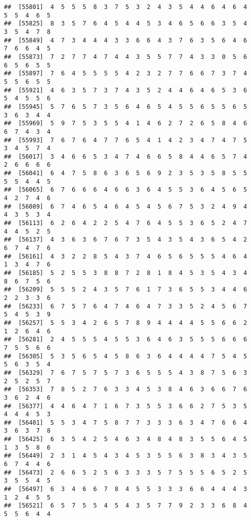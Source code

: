 \documentclass[
]{book}
\begin{document}
\begin{verbatim}
##  [55801]  4  5  5  5  8  3  7  5  3  2  4  3  5  4  4  6  4  6  4  5  5  4  6  5
##  [55825]  8  3  5  7  6  4  5  4  4  5  3  4  6  5  6  6  3  5  4  3  5  4  7  8
##  [55849]  4  7  3  4  4  4  3  3  6  6  4  3  7  6  3  5  6  4  6  7  6  6  4  5
##  [55873]  7  2  7  7  4  7  4  4  3  5  5  7  7  4  3  3  0  5  6  6  5  6  5  5
##  [55897]  7  6  4  5  5  5  5  4  2  3  2  7  7  6  6  7  3  7  4  5  5  6  5  5
##  [55921]  4  6  3  5  7  3  7  4  3  5  2  4  4  6  4  6  5  3  6  5  4  5  5  6
##  [55945]  5  7  6  5  7  3  5  6  4  6  5  4  5  5  6  5  5  6  5  3  6  3  4  4
##  [55969]  5  9  7  5  3  5  5  4  1  4  6  2  7  2  6  5  8  4  6  6  7  4  3  4
##  [55993]  7  6  7  6  4  7  7  6  5  4  1  4  2  3  4  7  4  7  5  3  4  5  7  4
##  [56017]  3  4  6  6  5  3  4  7  4  6  6  5  8  4  4  6  5  7  4  2  6  6  6  6
##  [56041]  6  4  7  5  8  6  3  6  5  6  9  2  3  5  3  5  8  5  5  5  5  4  4  5
##  [56065]  6  7  6  6  6  4  6  6  3  6  4  5  5  3  6  4  5  6  5  4  2  7  4  6
##  [56089]  6  7  4  6  5  4  6  4  5  4  5  6  7  5  3  2  4  9  4  4  3  5  3  4
##  [56113]  6  2  6  4  2  2  5  4  7  6  4  5  5  3  6  5  2  4  7  4  4  5  2  5
##  [56137]  4  3  6  3  6  7  6  7  3  5  4  3  5  4  3  6  5  4  2  6  7  4  7  6
##  [56161]  4  3  2  2  8  5  4  3  7  4  6  5  6  5  5  5  4  6  4  1  3  4  7  6
##  [56185]  5  2  5  5  3  8  8  7  2  8  1  8  4  5  3  5  4  3  4  8  6  7  5  6
##  [56209]  5  5  5  2  4  3  5  7  6  1  7  3  6  5  5  3  4  4  6  2  2  3  3  6
##  [56233]  6  7  5  7  6  4  7  4  6  4  7  3  3  5  2  4  5  6  7  5  4  5  3  9
##  [56257]  5  5  3  4  2  6  5  7  8  9  4  4  4  4  5  5  6  6  2  1  2  6  4  6
##  [56281]  2  4  5  5  5  4  5  5  3  6  4  6  3  5  5  5  6  6  6  7  5  5  6  6
##  [56305]  5  3  5  6  5  4  5  8  6  3  6  4  4  4  4  7  5  4  5  5  6  3  5  4
##  [56329]  7  6  7  5  7  5  7  3  6  5  5  5  4  3  8  7  5  6  3  2  5  2  5  7
##  [56353]  7  8  5  2  7  6  3  3  4  5  3  8  4  6  3  6  6  7  6  3  6  2  4  6
##  [56377]  4  4  6  4  7  1  6  7  3  5  5  3  6  6  2  7  5  3  5  4  4  4  5  3
##  [56401]  5  5  3  4  7  5  8  7  7  3  3  3  6  3  4  7  6  6  4  3  6  3  7  8
##  [56425]  6  3  5  4  2  5  4  6  3  4  8  4  8  3  5  5  6  4  5  1  3  5  8  6
##  [56449]  2  3  1  4  5  4  3  4  5  3  5  5  6  3  8  3  4  3  5  6  7  4  4  6
##  [56473]  2  6  6  5  2  5  6  3  3  3  5  7  5  5  5  6  5  2  5  3  5  5  4  5
##  [56497]  6  3  4  6  6  7  8  4  5  5  3  3  3  6  6  4  4  4  3  1  2  4  5  5
##  [56521]  6  5  7  5  5  4  5  4  3  5  7  7  9  2  3  3  6  8  4  5  5  6  4  4

\end{verbatim}
\end{document}
